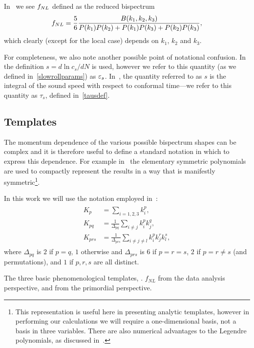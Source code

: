    In~\cite{px_burrage, transport_main} we see $f_{NL}$ defined as the reduced bispectrum
    \begin{align}
        f_{NL} = \frac{5}{6}\frac{B(k_1,k_2,k_3)}{P(k_1)P(k_2)+P(k_1)P(k_3)+P(k_2)P(k_3)},
    \end{align}
    which clearly (except for the local case) depends on $k_1$, $k_2$ and $k_3$.


    For completeness, we also note another possible point of notational confusion.
    In~\cite{px_burrage} the definition $s=d\ln c_s/dN$ is used, however we refer to this
    quantity (as we defined in~\eqref{slowrollparams}) as $\varepsilon_{s}$.
    In~\cite{Hu_2011}, the quantity referred to as $s$ is the integral of the sound speed
    with respect to conformal time---we refer to this quantity as $\tau_s$, defined in~\eqref{tausdef}.

    \subsection{Templates}
    The momentum dependence of the various possible bispectrum shapes can be complex
    and it is therefore useful to define a standard notation in which to express this dependence.
    For example in~\cite{Fergusson_2010, Pajer_boostless_2020} the elementary
    symmetric polynomials are used to compactly represent the results in a way that is manifestly
    symmetric\footnote{This representation is useful here in presenting analytic templates, however in performing
    our calculations we will require a one-dimensional basis, not a basis in three variables.
    There are also numerical advantages to the Legendre polynomials, as discussed in~\cite{Fergusson_2010}.}.


In this work we will use the notation employed in~\cite{FergShell_2}:
\begin{align}\label{shape_notation}
\begin{split}
    K_p &= \sum_{i=1,2,3} k_i^p, \\
    K_{pq} &= \frac{1}{\Delta_{pq}}\sum_{i\neq j} k_i^p k_j^q,   \\
    K_{prs} &= \frac{1}{\Delta_{prs}}\sum_{i\neq j\neq l} k_i^p k_j^r k_l^s,
\end{split}
\end{align}
where $\Delta_{pq}$ is $2$ if $p=q$, $1$ otherwise
and $\Delta_{prs}$ is $6$ if $p=r=s$, $2$ if $p=r\neq s$ (and permutations),
and $1$ if $p,r,s$ are all distinct.

    The three basic phenomenological templates, \planck.
    $f_{NL}$ from the data analysis perspective,
    and from the primordial perspective.

